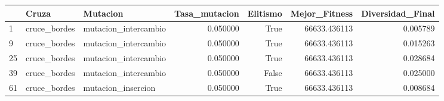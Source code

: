 \begin{tabular}{lllrrrr}
\toprule
 & Cruza & Mutacion & Tasa_mutacion & Elitismo & Mejor_Fitness & Diversidad_Final \\
\midrule
1 & cruce_bordes & mutacion_intercambio & 0.050000 & True & 66633.436113 & 0.005789 \\
9 & cruce_bordes & mutacion_intercambio & 0.050000 & True & 66633.436113 & 0.015263 \\
25 & cruce_bordes & mutacion_intercambio & 0.050000 & True & 66633.436113 & 0.028684 \\
39 & cruce_bordes & mutacion_intercambio & 0.050000 & False & 66633.436113 & 0.025000 \\
61 & cruce_bordes & mutacion_insercion & 0.050000 & True & 66633.436113 & 0.008684 \\
\bottomrule
\end{tabular}
